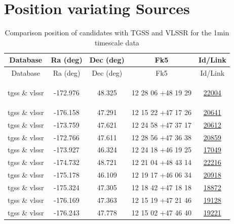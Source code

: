\documentclass{article}
\begin{document}
\section{Position variating Sources}\label{possection:KmeulenTrap4P23:1min}

\begin{longtable}{c|c|c|c|c} 
\toprule 
Database & Ra (deg) & Dec (deg)& Fk5 & Id/Link \\\midrule 
\endfirsthead 
\toprule 
Database & Ra (deg) & Dec (deg) & Fk5 &Id/Link  \\\midrule 
\endhead 
\bottomrule 
\endfoot 
\bottomrule
\caption{ Comparison position of candidates with TGSS and VLSSR for the 1min timescale data} 
\endlastfoot
\label{KmeulenTrap4P23:1min:tablepos}

tgss \& vlssr & -172.976 & 48.325 & 12 28 06 +48 19 29 &  \href{http://banana.transientskp.org/r4/vlo_KmeulenTrap4P23/runningcatalog/22004}{22004} \\
tgss \& vlssr & -176.158 & 47.291 & 12 15 22 +47 17 26 &  \href{http://banana.transientskp.org/r4/vlo_KmeulenTrap4P23/runningcatalog/20641}{20641} \\
tgss \& vlssr & -173.759 & 47.621 & 12 24 58 +47 37 17 &  \href{http://banana.transientskp.org/r4/vlo_KmeulenTrap4P23/runningcatalog/20612}{20612} \\
tgss \& vlssr & -172.766 & 47.611 & 12 28 56 +47 36 38 &  \href{http://banana.transientskp.org/r4/vlo_KmeulenTrap4P23/runningcatalog/20859}{20859} \\
tgss \& vlssr & -173.927 & 46.324 & 12 24 18 +46 19 25 &  \href{http://banana.transientskp.org/r4/vlo_KmeulenTrap4P23/runningcatalog/17049}{17049} \\
tgss \& vlssr & -174.732 & 48.721 & 12 21 04 +48 43 14 &  \href{http://banana.transientskp.org/r4/vlo_KmeulenTrap4P23/runningcatalog/22216}{22216} \\
tgss \& vlssr & -175.178 & 46.109 & 12 19 17 +46 06 34 &  \href{http://banana.transientskp.org/r4/vlo_KmeulenTrap4P23/runningcatalog/20918}{20918} \\
tgss \& vlssr & -175.324 & 47.305 & 12 18 42 +47 18 18 &  \href{http://banana.transientskp.org/r4/vlo_KmeulenTrap4P23/runningcatalog/18872}{18872} \\
tgss \& vlssr & -176.169 & 47.363 & 12 15 19 +47 21 46 &  \href{http://banana.transientskp.org/r4/vlo_KmeulenTrap4P23/runningcatalog/19128}{19128} \\
tgss \& vlssr & -176.243 & 47.778 & 12 15 02 +47 46 40 &  \href{http://banana.transientskp.org/r4/vlo_KmeulenTrap4P23/runningcatalog/19221}{19221} \\

\end{longtable}
\end{document}
